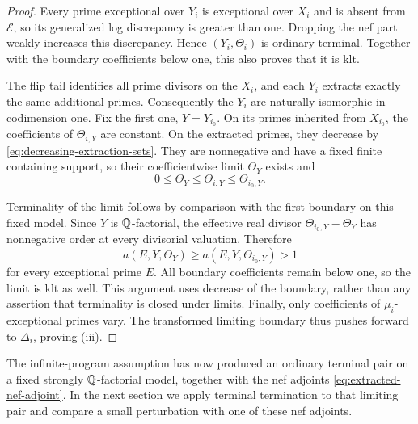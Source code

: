 \begin{proof}
Every prime exceptional over \(Y_i\) is exceptional over \(X_i\)
and is absent from \(\mathcal E\), so its generalized log
discrepancy is greater than one.  Dropping the nef part weakly
increases this discrepancy.  Hence \((Y_i,\Theta_i)\) is ordinary
terminal.  Together with the boundary coefficients below one, this
also proves that it is klt.

The flip tail identifies all prime divisors on the \(X_i\), and
each \(Y_i\) extracts exactly the same additional primes.
Consequently the \(Y_i\) are naturally isomorphic in codimension
one.  Fix the first one, \(Y=Y_{i_0}\).  On its primes inherited
from \(X_{i_0}\), the coefficients of \(\Theta_{i,Y}\) are
constant.  On the extracted primes, they decrease by
\eqref{eq:decreasing-extraction-sets}.  They are nonnegative and
have a fixed finite containing support, so their coefficientwise
limit \(\Theta_Y\) exists and
\[
 0\leq\Theta_Y\leq\Theta_{i,Y}\leq\Theta_{i_0,Y}.
\]

Terminality of the limit follows by comparison with the first
boundary on this fixed model.  Since \(Y\) is \(\mathbb Q\)-factorial,
the effective real divisor \(\Theta_{i_0,Y}-\Theta_Y\) has
nonnegative order at every divisorial valuation.  Therefore
\[
 a(E,Y,\Theta_Y)\geq a(E,Y,\Theta_{i_0,Y})>1
\]
for every exceptional prime \(E\).  All boundary coefficients
remain below one, so the limit is klt as well.  This argument uses
decrease of the boundary, rather than any assertion that terminality
is closed under limits.  Finally, only coefficients of
\(\mu_i\)-exceptional primes vary.  The transformed limiting
boundary thus pushes forward to \(\Delta_i\), proving (iii).
\end{proof}

The infinite-program assumption has now produced an ordinary terminal
pair on a fixed strongly \(\mathbb Q\)-factorial model, together with the
nef adjoints \eqref{eq:extracted-nef-adjoint}.  In the next section we
apply terminal termination to that limiting pair and compare a small
perturbation with one of these nef adjoints.
